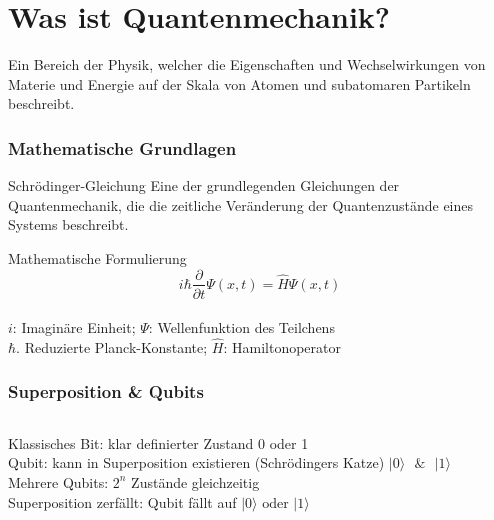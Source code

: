 \section{Was ist Quantenmechanik?}
\begin{frame}
	\begin{theorem}
		Ein Bereich der Physik, welcher die Eigenschaften und Wechselwirkungen von Materie und Energie auf der Skala von Atomen und subatomaren Partikeln beschreibt.
	\end{theorem}
\end{frame}

\begin{frame}
	\frametitle{Mathematische Grundlagen}
	\begin{block}{Schrödinger-Gleichung}
		Eine der grundlegenden Gleichungen der Quantenmechanik, die die zeitliche Veränderung der Quantenzustände eines Systems beschreibt.
	\end{block}
	\pause
	\begin{alertblock}{Mathematische Formulierung}
		\[i \hbar \frac{\partial}{\partial t} \Psi(x,t) = \hat{H} \Psi(x,t)\]\\
		$i$: Imagin{\"a}re Einheit; $\Psi$: Wellenfunktion des Teilchens\\
		$\hbar$. Reduzierte Planck-Konstante; $\hat{H}$: Hamiltonoperator
	\end{alertblock}
\end{frame}

\begin{frame}
	\frametitle{Superposition \& Qubits}
	\begin{columns}
		\begin{column}{0.48\linewidth}
			Klassisches Bit: klar definierter Zustand \textrightarrow { }0 oder 1\\
			\vspace{0.5em}
			Qubit: kann in Superposition existieren (Schr{\"o}dingers Katze)
			$|0\rangle{\text{ }}\&{\text{ }}|1\rangle$\\
			\vspace{0.5em}
			Mehrere Qubits: $2^n$ Zust{\"a}nde gleichzeitig\\
			\vspace{0.5em}
			Superposition zerf{\"a}llt: Qubit f{\"a}llt auf $|0\rangle\text{ oder }|1\rangle$
		\end{column}
		\begin{column}{0.48\linewidth}
		\end{column}
	\end{columns}
\end{frame}

